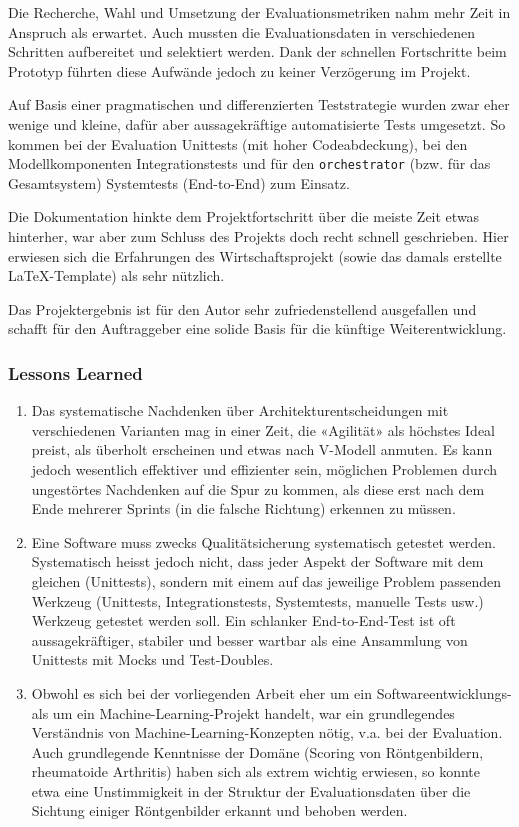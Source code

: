 Die Recherche, Wahl und Umsetzung der Evaluationsmetriken nahm mehr Zeit in Anspruch als erwartet. Auch mussten die Evaluationsdaten in verschiedenen Schritten aufbereitet und selektiert werden. Dank der schnellen Fortschritte beim Prototyp führten diese Aufwände jedoch zu keiner Verzögerung im Projekt.

Auf Basis einer pragmatischen und differenzierten Teststrategie wurden zwar eher wenige und kleine, dafür aber aussagekräftige automatisierte Tests umgesetzt. So kommen bei der Evaluation Unittests (mit hoher Codeabdeckung), bei den Modellkomponenten Integrationstests und für den \texttt{orchestrator} (bzw. für das Gesamtsystem) Systemtests (End-to-End) zum Einsatz.

Die Dokumentation hinkte dem Projektfortschritt über die meiste Zeit etwas hinterher, war aber zum Schluss des Projekts doch recht schnell geschrieben. Hier erwiesen sich die Erfahrungen des Wirtschaftsprojekt (sowie das damals erstellte \LaTeX{}-Template) als sehr nützlich.

Das Projektergebnis ist für den Autor sehr zufriedenstellend ausgefallen und schafft für den Auftraggeber eine solide Basis für die künftige Weiterentwicklung.

\subsubsection{Lessons Learned}

\begin{enumerate}
    \item Das systematische Nachdenken über Architekturentscheidungen mit verschiedenen Varianten mag in einer Zeit, die «Agilität» als höchstes Ideal preist, als überholt erscheinen und etwas nach V-Modell anmuten. Es kann jedoch wesentlich effektiver und effizienter sein, möglichen Problemen durch ungestörtes Nachdenken auf die Spur zu kommen, als diese erst nach dem Ende mehrerer Sprints (in die falsche Richtung) erkennen zu müssen.
    \item Eine Software muss zwecks Qualitätsicherung systematisch getestet werden. Systematisch heisst jedoch nicht, dass jeder Aspekt der Software mit dem gleichen (Unittests), sondern mit einem auf das jeweilige Problem passenden Werkzeug (Unittests, Integrationstests, Systemtests, manuelle Tests usw.) Werkzeug getestet werden soll. Ein schlanker End-to-End-Test ist oft aussagekräftiger, stabiler und besser wartbar als eine Ansammlung von Unittests mit Mocks und Test-Doubles.
    \item Obwohl es sich bei der vorliegenden Arbeit eher um ein Softwareentwicklungs- als um ein Machine-Learning-Projekt  handelt, war ein grundlegendes Verständnis von Machine-Learning-Konzepten nötig, v.a. bei der Evaluation. Auch grundlegende Kenntnisse der Domäne (Scoring von Röntgenbildern, rheumatoide Arthritis) haben sich als extrem wichtig erwiesen, so konnte etwa eine Unstimmigkeit in der Struktur der Evaluationsdaten über die Sichtung einiger Röntgenbilder erkannt und behoben werden.
\end{enumerate}

